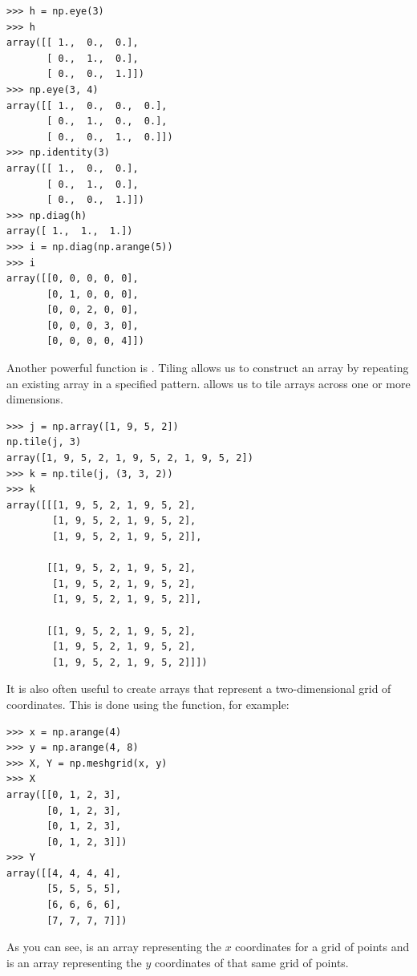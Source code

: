 \begin{lstlisting}
>>> h = np.eye(3) 
>>> h
array([[ 1.,  0.,  0.],
       [ 0.,  1.,  0.],
       [ 0.,  0.,  1.]])
>>> np.eye(3, 4)
array([[ 1.,  0.,  0.,  0.],
       [ 0.,  1.,  0.,  0.],
       [ 0.,  0.,  1.,  0.]])
>>> np.identity(3)
array([[ 1.,  0.,  0.],
       [ 0.,  1.,  0.],
       [ 0.,  0.,  1.]])
>>> np.diag(h)
array([ 1.,  1.,  1.])
>>> i = np.diag(np.arange(5))
>>> i
array([[0, 0, 0, 0, 0],
       [0, 1, 0, 0, 0],
       [0, 0, 2, 0, 0],
       [0, 0, 0, 3, 0],
       [0, 0, 0, 0, 4]])
\end{lstlisting} 

Another powerful function is
. Tiling allows us to construct an array by repeating an existing array
 in a specified pattern.  allows us to tile arrays across one or more dimensions. 
\begin{lstlisting}
>>> j = np.array([1, 9, 5, 2]) 
np.tile(j, 3)
array([1, 9, 5, 2, 1, 9, 5, 2, 1, 9, 5, 2])
>>> k = np.tile(j, (3, 3, 2)) 
>>> k
array([[[1, 9, 5, 2, 1, 9, 5, 2],
        [1, 9, 5, 2, 1, 9, 5, 2],
        [1, 9, 5, 2, 1, 9, 5, 2]],

       [[1, 9, 5, 2, 1, 9, 5, 2],
        [1, 9, 5, 2, 1, 9, 5, 2],
        [1, 9, 5, 2, 1, 9, 5, 2]],

       [[1, 9, 5, 2, 1, 9, 5, 2],
        [1, 9, 5, 2, 1, 9, 5, 2],
        [1, 9, 5, 2, 1, 9, 5, 2]]])

\end{lstlisting}


It is also often useful to create arrays that represent a
two-dimensional grid of coordinates. This is done using the
 function, for example:
\begin{lstlisting}
>>> x = np.arange(4) 
>>> y = np.arange(4, 8) 
>>> X, Y = np.meshgrid(x, y) 
>>> X
array([[0, 1, 2, 3],
       [0, 1, 2, 3],
       [0, 1, 2, 3],
       [0, 1, 2, 3]])
>>> Y
array([[4, 4, 4, 4],
       [5, 5, 5, 5],
       [6, 6, 6, 6],
       [7, 7, 7, 7]])
\end{lstlisting} 
As you can see,  is an array representing the $x$
coordinates for a grid of points and  is an array representing the
$y$ coordinates of that same grid of points. 

